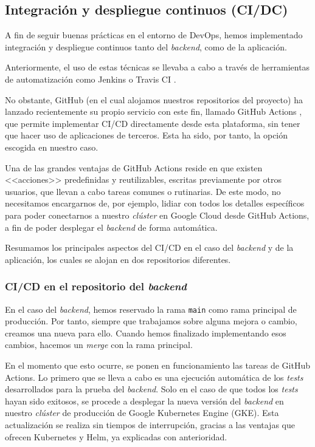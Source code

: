 \subsection{Integración y despliegue continuos (CI/DC)}

A fin de seguir buenas prácticas en el entorno de DevOps, hemos implementado integración y despliegue continuos tanto del \emph{backend}, como de la aplicación.

Anteriormente, el uso de estas técnicas se llevaba a cabo a través de herramientas de automatización como Jenkins \cite{jenkins} o Travis CI \cite{travis}.

No obstante, GitHub (en el cual alojamos nuestros repositorios del proyecto) ha lanzado recientemente su propio servicio con este fin, llamado GitHub Actions \cite{github-actions}, que permite implementar CI/CD directamente desde esta plataforma, sin tener que hacer uso de aplicaciones de terceros. Esta ha sido, por tanto, la opción escogida en nuestro caso.

Una de las grandes ventajas de GitHub Actions reside en que existen <<acciones>> predefinidas y reutilizables, escritas previamente por otros usuarios, que llevan a cabo tareas comunes o rutinarias. De este modo, no necesitamos encargarnos de, por ejemplo, lidiar con todos los detalles específicos para poder conectarnos a nuestro \emph{clúster} en Google Cloud desde GitHub Actions, a fin de poder desplegar el \emph{backend} de forma automática.

Resumamos los principales aspectos del CI/CD en el caso del \emph{backend} y de la aplicación, los cuales se alojan en dos repositorios diferentes.

\subsubsection{CI/CD en el repositorio del \emph{backend}}

En el caso del \emph{backend}, hemos reservado la rama \texttt{main} como rama principal de producción. Por tanto, siempre que trabajamos sobre alguna mejora o cambio, creamos una nueva para ello. Cuando hemos finalizado implementando esos cambios, hacemos un \emph{merge} con la rama principal.

En el momento que esto ocurre, se ponen en funcionamiento las tareas de GitHub Actions. Lo primero que se lleva a cabo es una ejecución automática de los \emph{tests} desarrollados para la prueba del \emph{backend}. Solo en el caso de que todos los \emph{tests} hayan sido exitosos, se procede a desplegar la nueva versión del \emph{backend} en nuestro \emph{clúster} de producción de Google Kubernetes Engine (GKE). Esta actualización se realiza sin tiempos de interrupción, gracias a las ventajas que ofrecen Kubernetes y Helm, ya explicadas con anterioridad.

